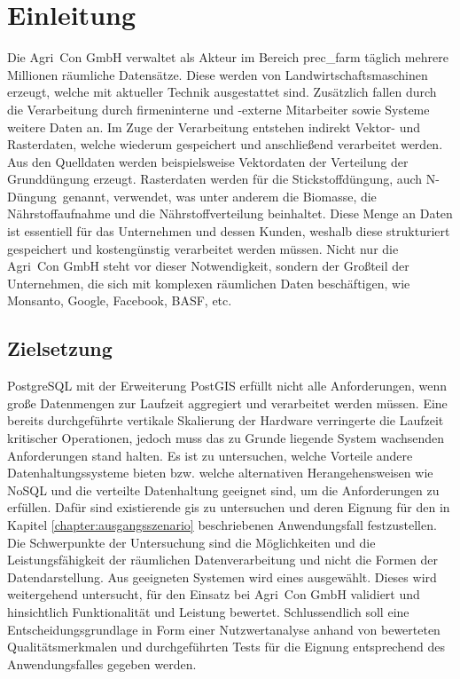 \chapter{Einleitung}
Die Agri~Con GmbH verwaltet als Akteur im Bereich \Gls{prec_farm} täglich mehrere Millionen räumliche Datensätze.
Diese werden von Landwirtschaftsmaschinen erzeugt, welche mit aktueller Technik ausgestattet sind.
Zusätzlich fallen durch die Verarbeitung durch firmeninterne und -externe Mitarbeiter sowie Systeme weitere Daten an.
Im Zuge der Verarbeitung entstehen indirekt Vektor- und Rasterdaten, welche wiederum gespeichert und anschließend verarbeitet werden.
Aus den Quelldaten werden beispielsweise Vektordaten der Verteilung der Grunddüngung erzeugt.
Rasterdaten werden für die Stickstoffdüngung, auch \glqq N-Düngung\grqq\ genannt, verwendet, was unter anderem die Biomasse, die Nährstoffaufnahme und die Nährstoffverteilung beinhaltet.
Diese Menge an Daten ist essentiell für das Unternehmen und dessen Kunden, weshalb diese strukturiert gespeichert und kostengünstig verarbeitet werden müssen.
Nicht nur die Agri~Con GmbH steht vor dieser Notwendigkeit, sondern der Großteil der Unternehmen, die sich mit komplexen räumlichen Daten beschäftigen, wie Monsanto, Google, Facebook, BASF, etc.

\section{Zielsetzung}
PostgreSQL mit der Erweiterung PostGIS erfüllt nicht alle Anforderungen, wenn große Datenmengen zur Laufzeit aggregiert und verarbeitet werden müssen. %
Eine bereits durchgeführte vertikale Skalierung der Hardware verringerte die Laufzeit kritischer Operationen, jedoch muss das zu Grunde liegende System wachsenden Anforderungen stand halten.
Es ist zu untersuchen, welche Vorteile andere Datenhaltungssysteme bieten bzw. welche alternativen Herangehensweisen wie NoSQL und die verteilte Datenhaltung geeignet sind, um die Anforderungen zu erfüllen. %
Dafür sind existierende \Gls{gis} zu untersuchen und deren Eignung für den in Kapitel \ref{chapter:ausgangsszenario} beschriebenen Anwendungsfall festzustellen.
Die Schwerpunkte der Untersuchung sind die Möglichkeiten und die Leistungsfähigkeit der räumlichen Datenverarbeitung und nicht die Formen der Datendarstellung.
Aus geeigneten Systemen wird eines ausgewählt.
Dieses wird weitergehend untersucht, für den Einsatz bei Agri~Con GmbH validiert und hinsichtlich Funktionalität und Leistung bewertet.
Schlussendlich soll eine Entscheidungsgrundlage in Form einer Nutzwertanalyse anhand von bewerteten Qualitätsmerkmalen und durchgeführten Tests für die Eignung entsprechend des Anwendungsfalles gegeben werden.

